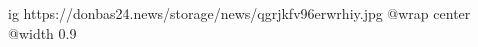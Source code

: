  
 
 
 
 

\ifcmt
  ig https://donbas24.news/storage/news/qgrjkfv96erwrhiy.jpg
  @wrap center
  @width 0.9
\fi
